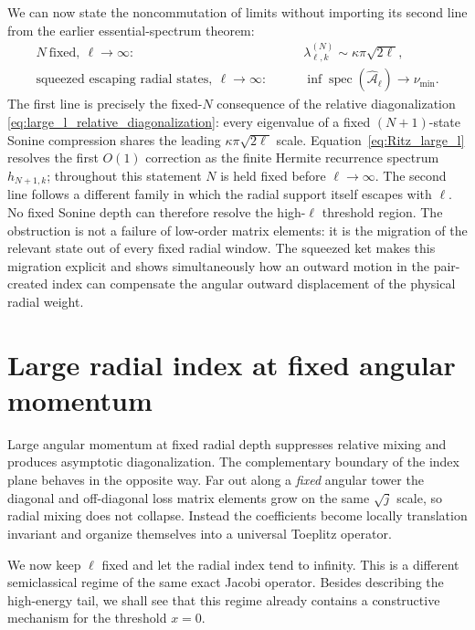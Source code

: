 \documentclass[11pt]{article}
\numberwithin{equation}{section}
\newcommand{\spec}{\operatorname{spec}}
\theoremstyle{definition}
\begin{document}
We can now state the noncommutation of limits without importing its second
line from the earlier essential-spectrum theorem:
\begin{equation}
 \boxed{
 \begin{aligned}
 N\ \text{fixed},\ \ell\to\infty:
 &\qquad
 \lambda^{(N)}_{\ell,k}\sim\kappa\pi\sqrt{2\ell},
 \\
 \text{squeezed escaping radial states},\ \ell\to\infty:
 &\qquad
 \inf\spec(\widehat{\mathcal A}_\ell)\to\nu_{\min}.
 \end{aligned}
 }
 \label{eq:noncommute}
\end{equation}
The first line is precisely the fixed-$N$ consequence of the relative
diagonalization \eqref{eq:large_l_relative_diagonalization}: every eigenvalue of
a fixed $(N+1)$-state Sonine compression shares the leading
$\kappa\pi\sqrt{2\ell}$ scale.  Equation~\eqref{eq:Ritz_large_l} resolves the
first $O(1)$ correction as the finite Hermite recurrence spectrum
$h_{N+1,k}$; throughout this statement $N$ is held fixed before
$\ell\to\infty$.  The second line follows a different family in which the radial
support itself escapes with $\ell$.
No fixed Sonine depth can therefore resolve the high-$\ell$ threshold region.
The obstruction is not a failure of low-order matrix elements: it is the
migration of the relevant state out of every fixed radial window.  The
squeezed ket makes this migration explicit and shows simultaneously how an
outward motion in the pair-created index can compensate the angular outward
displacement of the physical radial weight.

\section{Large radial index at fixed angular momentum}
\label{sec:large_j}

Large angular momentum at fixed radial depth suppresses relative mixing and
produces asymptotic diagonalization.  The complementary boundary of the index
plane behaves in the opposite way.  Far out along a \emph{fixed} angular
tower the diagonal and off-diagonal loss matrix elements grow on the same
$\sqrt j$ scale, so radial mixing does not collapse.  Instead the coefficients
become locally translation invariant and organize themselves into a universal
Toeplitz operator.

We now keep $\ell$ fixed and let the radial index tend to infinity.  This is a
different semiclassical regime of the same exact Jacobi operator.  Besides
describing the high-energy tail, we shall see that this regime already
contains a constructive mechanism for the threshold $x=0$.
\end{document}
